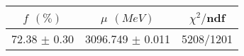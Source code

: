 \begin{tabular}{c|c||c}
 $f$ $(\%)$ & $\mu$ $(MeV)$ & $\chi^2/$ndf \\
\hline
72.38 $\pm$ 0.30 & 3096.749 $\pm$ 0.011 & 5208/1201\\
\end{tabular}

